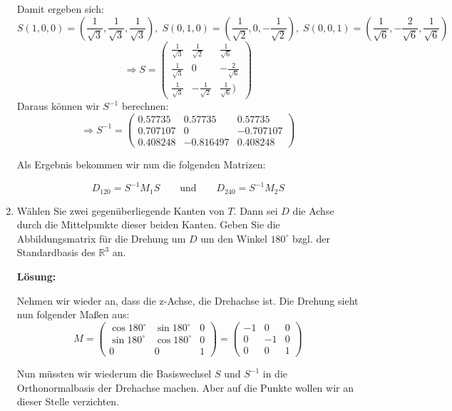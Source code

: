 \documentclass[11pt,a4paper,ngerman]{article}
\newcommand{\R}{\mathbb{R}}
\begin{document}
\begin{enumerate}[\bfseries (a)]
Damit ergeben sich:
$$
S (1,0,0) = (\frac{1}{\sqrt{3}} , \frac{1}{\sqrt{3}} , \frac{1}{\sqrt{3}}) , \; S (0,1,0) = (\frac{1}{\sqrt{2}},0,- \frac{1}{\sqrt{2}}), \; S (0,0,1) = (\frac{1}{\sqrt{6}}, - \frac{2}{\sqrt{6}}, \frac{1}{\sqrt{6}})
$$
$$
\Rightarrow S = \left( 
\begin{array}{ccc}
\frac{1}{\sqrt{3}} &  \frac{1}{\sqrt{2}} & \frac{1}{\sqrt{6}}\\
\frac{1}{\sqrt{3}} & 0 & - \frac{2}{\sqrt{6}} \\
\frac{1}{\sqrt{3}} & - \frac{1}{\sqrt{2}} & \frac{1}{\sqrt{6}})
\end{array}
\right)
$$
Daraus können wir $S^{-1}$ berechnen:
$$
\Rightarrow S^{-1} = \left(
\begin{array}{ccc}
0.57735 & 0.57735 & 0.57735\\
0.707107 & 0 & - 0.707107\\
0.408248 & -0.816497 & 0.408248 
\end{array}
\right)
$$

Als Ergebnis bekommen wir nun die folgenden Matrizen:

$$D_{120} = S^{-1} M_1 S \qquad \text{und} \qquad D_{240} = S^{-1} M_2 S$$

\item Wählen Sie zwei gegenüberliegende Kanten von $T$. Dann sei $D$ die Achse durch die Mittelpunkte dieser beiden Kanten. Geben Sie die Abbildungsmatrix für die Drehung um $D$ um den Winkel $180^\circ$ bzgl. der Standardbasis des $\R ^3$ an.

\pagebreak

\textbf{Lösung:}

Nehmen wir wieder an, dass die z-Achse, die Drehachse ist. Die Drehung sieht nun folgender Maßen aus:
$$
M = \left(
\begin{array}{ccc}
\cos 180^\circ & \sin 180^\circ & 0 \\
\sin 180^\circ & \cos 180^\circ & 0 \\
0 & 0 & 1
\end{array}
\right) = \left(
\begin{array}{ccc}
-1 & 0 & 0 \\
0 & -1 & 0 \\
0 & 0 & 1
\end{array}
\right)
$$

Nun müssten wir wiederum die Basiswechsel $S$ und $S^{-1}$ in die Orthonormalbasis der Drehachse machen. Aber auf die Punkte wollen wir an dieser Stelle verzichten.

\end{enumerate}
\end{document}
